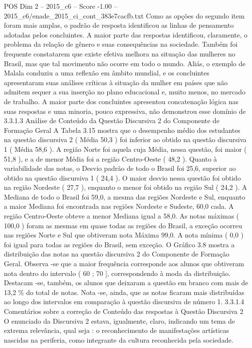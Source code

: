 \begin{textsample}{POS Dim 2 – 2015\_c6 – Score -1.00 – 2015\_c6/enade\_2015\_ci\_cont\_383e7cacfb.txt}
Como as opções do segundo item foram mais amplas, o padrão de resposta identificou as linhas de pensamento adotadas pelos concluintes.
A maior parte das respostas identificou, claramente, o problema da relação de gênero e suas consequências na sociedade.
Também foi frequente constatarem que existe efetiva melhora na situação das mulheres no Brasil, mas que tal movimento não ocorre em todo o mundo.
Aliás, o exemplo de Malala conduziu a uma reflexão em âmbito mundial, e os concluintes apresentaram suas análises críticas à situação da mulher em países que não admitem sequer a sua inserção no plano educacional e, muito menos, no mercado de trabalho.
A maior parte dos concluintes apresentou concatenação lógica nas suas respostas e uma minoria, pouco expressiva, não demonstrou esse domínio de 3.3.1.3 Análise de Conteúdo da Questão Discursiva 2 do Componente de Formação Geral A Tabela 3.15 mostra que o desempenho médio dos estudantes na questão discursiva 2 ( Média 50,3 ) foi inferior ao obtido na questão discursiva 1 ( Média 58,6 ).
A região Norte foi aquela cuja Média, nessa questão, foi maior ( 51,8 ), e a de menor Média foi a região Centro-Oeste ( 48,2 ).
Quanto à variabilidade das notas, o Desvio padrão de todo o Brasil foi 25,6, superior ao obtido na questão discursiva 1 ( 24,4 ).
O maior desvio nessa questão foi obtido na região Nordeste ( 27,7 ), enquanto o menor foi obtido na região Sul ( 24,2 ).
A Mediana de todo o Brasil foi 59,0, a mesma das regiões Nordeste e Sul, enquanto a maior Mediana foi encontrada nas regiões Nordeste e Sudeste, 60,0 cada.
A região Centro-Oeste obteve a menor Mediana igual a 58,0.
As notas máximas ( 100,0 ) foram as mesmas em quase todas as regiões do Brasil, a exceção ocorreu nas regiões Norte e Sul que obtiveram nota Máxima 99,0.
A nota mínima ( 0,0 ) foi igual para todas as regiões do Brasil, sem exceção.
O Gráfico 3.8 mostra a distribuição das notas na questão discursiva 2 do Componente de Formação Geral.
Observa -se que a maior frequência corresponde aos alunos que obtiveram nota dentro do intervalo ( 60 ; 70 ], correspondendo à moda da distribuição.
Destacam -se, também, os alunos que deixaram a questão em branco com mais de 13,2 \% do total de notas.
Nota -se, ainda, que as notas ficaram mais distribuídas ao longo dos intervalos em comparação à questão discursiva de número 1. 3.3.1.4 Comentários sobre a correção de Conteúdo das respostas à Questão Discursiva 2 O enunciado da Discursiva 2 estava, igualmente, claro, indicando um tema de extrema relevância, qual seja : o reconhecimento de manifestações artísticas nascidas na periferia, como integrante da cultura reconhecida pela sociedade.

\end{textsample}
